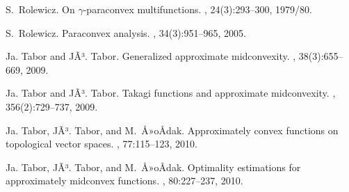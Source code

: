 \documentclass[12pt,leqno]{amsart}
\theoremstyle{definition}
\begin{document}
\begin{thebibliography}{10}
S.~Rolewicz.
\newblock On {$\gamma $}-paraconvex multifunctions.
, 24(3):293--300, 1979/80.

S.~Rolewicz.
\newblock Paraconvex analysis.
, 34(3):951--965, 2005.

Ja. Tabor and JÃ³. Tabor.
\newblock Generalized approximate midconvexity.
, 38(3):655--669, 2009.

Ja. Tabor and JÃ³. Tabor.
\newblock Takagi functions and approximate midconvexity.
, 356(2):729--737, 2009.

Ja. Tabor, JÃ³. Tabor, and M.~Å»oÅdak.
\newblock Approximately convex functions on topological vector spaces.
, 77:115--123, 2010.

Ja. Tabor, JÃ³. Tabor, and M.~Å»oÅdak.
\newblock Optimality estimations for approximately midconvex functions.
, 80:227--237, 2010.

\end{thebibliography}
\end{document}

